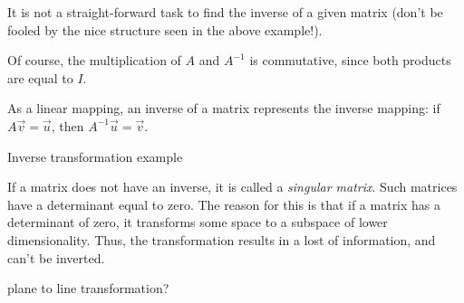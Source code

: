 \begin{warning}
  It is not a straight-forward task to find the inverse of a given matrix (don't be fooled by the nice structure seen in the above example!).
\end{warning}

Of course, the multiplication of $A$ and $A^{-1}$ is commutative, since both products are equal to $I$.

As a linear mapping, an inverse of a matrix represents the inverse mapping: if $A\vec{v}=\vec{u}$, then $A^{-1}\vec{u}=\vec{v}$.
\begin{example}
  
  Inverse transformation example
\end{example}

If a matrix does not have an inverse, it is called a \emph{singular matrix}. Such matrices have a determinant equal to zero. The reason for this is that if a matrix has a determinant of zero, it transforms some space to a subspace of lower dimensionality. Thus, the transformation results in a lost of information, and can't be inverted.
\begin{example}
  
  plane to line transformation?
\end{example}

